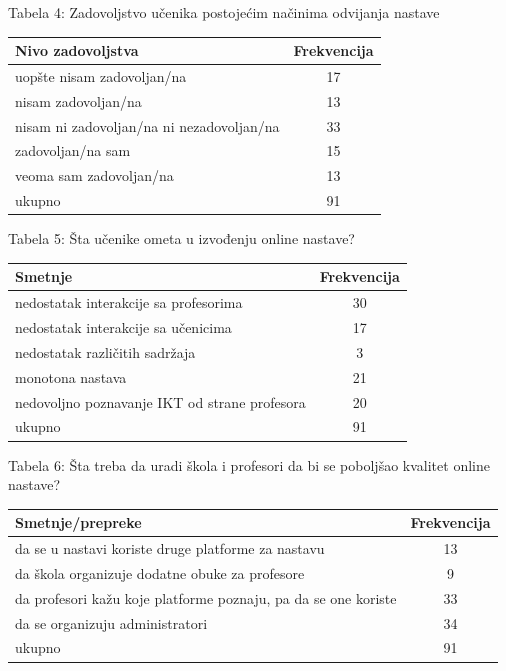 \documentclass{article}
\begin{document}
Tabela 4: Zadovoljstvo učenika postojećim načinima odvijanja nastave
\begin{center}
  \begin{tabular}{ | l | c |}
    \hline
    Nivo zadovoljstva & Frekvencija \\ \hline
    uopšte nisam zadovoljan/na & 17  \\ \hline 
    nisam zadovoljan/na & 13  \\ \hline
    nisam ni zadovoljan/na ni nezadovoljan/na & 33 \\ \hline
    zadovoljan/na sam &  15 \\ \hline
    veoma sam zadovoljan/na & 13 \\ \hline
    ukupno & 91 \\
    \hline
  \end{tabular}
\end{center}

Tabela 5: Šta učenike ometa u izvođenju online nastave?
\begin{center}
  \begin{tabular}{ | l | c |}
    \hline
    Smetnje & Frekvencija \\ \hline
    nedostatak interakcije sa profesorima & 30  \\ \hline 
    nedostatak interakcije sa učenicima & 17  \\ \hline
    nedostatak različitih sadržaja & 3 \\ \hline
    monotona nastava & 21 \\ \hline
    nedovoljno poznavanje IKT od strane profesora & 20 \\ \hline
    ukupno & 91 \\
    \hline
  \end{tabular}
\end{center}

Tabela 6: Šta treba da uradi škola i profesori da bi se poboljšao kvalitet online nastave?
\begin{center}
  \begin{tabular}{ | l | c |}
    \hline
    Smetnje/prepreke & Frekvencija \\ \hline
    da se u nastavi koriste druge platforme za nastavu & 13  \\ \hline 
    da škola organizuje dodatne obuke za profesore & 9  \\ \hline
    da profesori kažu koje platforme poznaju, pa da se one koriste & 33 \\ \hline
    da se organizuju administratori & 34 \\ \hline
    ukupno & 91 \\
    \hline
  \end{tabular}
\end{center}
\end{document}
